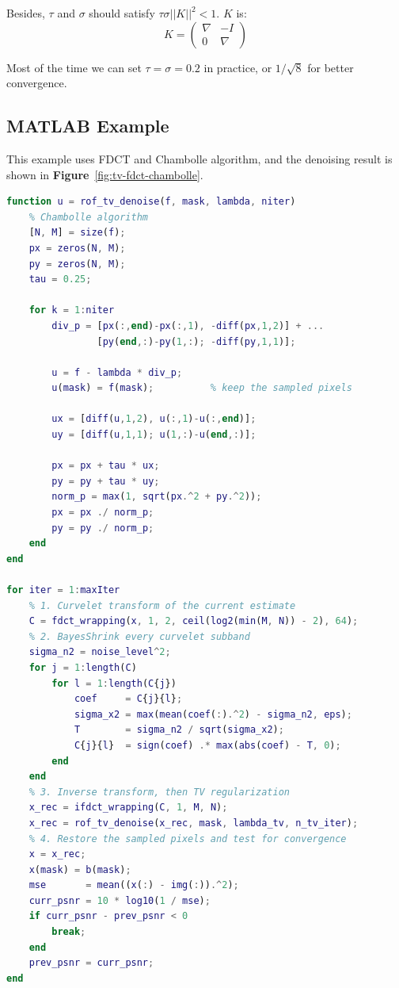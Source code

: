 \documentclass[10pt,a4paper,oneside,numbers=noenddot]{scrbook}
\newcommand*{\figref}[1]{\textbf{Figure}~\ref{#1}}
\theoremstyle{ctplain}
\theoremstyle{ctresult}
\begin{document}
Besides, $\tau$ and $\sigma$ should satisfy $\tau \sigma ||K||^2 < 1$. $K$ is:
\[
  K = \begin{pmatrix}
    \nabla & -I \\
    0 & \nabla
  \end{pmatrix}
\]

Most of the time we can set $\tau = \sigma = 0.2$ in practice, or $1/\sqrt{8}$
for better convergence.


\subsection{MATLAB Example}

This example uses FDCT and Chambolle algorithm, and the denoising result is shown in
\figref{fig:tv-fdct-chambolle}.

\begin{lstlisting}[language=Matlab]
function u = rof_tv_denoise(f, mask, lambda, niter)
    % Chambolle algorithm
    [N, M] = size(f);
    px = zeros(N, M);
    py = zeros(N, M);
    tau = 0.25;

    for k = 1:niter
        div_p = [px(:,end)-px(:,1), -diff(px,1,2)] + ...
                [py(end,:)-py(1,:); -diff(py,1,1)];

        u = f - lambda * div_p;
        u(mask) = f(mask);          % keep the sampled pixels

        ux = [diff(u,1,2), u(:,1)-u(:,end)];
        uy = [diff(u,1,1); u(1,:)-u(end,:)];

        px = px + tau * ux;
        py = py + tau * uy;
        norm_p = max(1, sqrt(px.^2 + py.^2));
        px = px ./ norm_p;
        py = py ./ norm_p;
    end
end

for iter = 1:maxIter
    % 1. Curvelet transform of the current estimate
    C = fdct_wrapping(x, 1, 2, ceil(log2(min(M, N)) - 2), 64);
    % 2. BayesShrink every curvelet subband
    sigma_n2 = noise_level^2;
    for j = 1:length(C)
        for l = 1:length(C{j})
            coef     = C{j}{l};
            sigma_x2 = max(mean(coef(:).^2) - sigma_n2, eps);
            T        = sigma_n2 / sqrt(sigma_x2);
            C{j}{l}  = sign(coef) .* max(abs(coef) - T, 0);
        end
    end
    % 3. Inverse transform, then TV regularization
    x_rec = ifdct_wrapping(C, 1, M, N);
    x_rec = rof_tv_denoise(x_rec, mask, lambda_tv, n_tv_iter);
    % 4. Restore the sampled pixels and test for convergence
    x = x_rec;
    x(mask) = b(mask);
    mse       = mean((x(:) - img(:)).^2);
    curr_psnr = 10 * log10(1 / mse);
    if curr_psnr - prev_psnr < 0
        break;
    end
    prev_psnr = curr_psnr;
end
\end{lstlisting}
\end{document}
